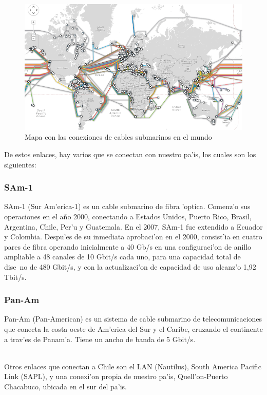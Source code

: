 \documentclass{article}
\begin{document}
\begin{figure}[H]
  \centering
    \includegraphics[width=1.0\textwidth]{mapamundo_enlaces}
  \caption{Mapa con las conexiones de cables submarinos en el mundo}
  \label{mapa}
\end{figure}

De estos enlaces, hay varios que se conectan con nuestro pa'is, los cuales son los siguientes:

\subsubsection{SAm-1}
SAm-1 (Sur Am'erica-1) es un cable submarino de fibra 'optica. Comenz'o sus operaciones en el a\~no 2000, conectando a Estados Unidos, Puerto Rico, Brasil, Argentina, Chile, Per'u y Guatemala. En el 2007, SAm-1 fue extendido a Ecuador y Colombia. Despu'es de su inmediata aprobaci'on en el 2000, consist'ia en cuatro pares de fibra operando inicialmente a 40 Gb/s en una configuraci'on de anillo ampliable a 48 canales de 10 Gbit/s cada uno, para una capacidad total de dise~no de 480 Gbit/s, y con la actualizaci'on de capacidad de uso alcanz'o 1,92 Tbit/s.

\subsubsection{Pan-Am}
Pan-Am (Pan-American) es un sistema de cable submarino de telecomunicaciones que conecta la costa oeste de Am'erica del Sur y el Caribe, cruzando el continente a trav'es de Panam'a. Tiene un ancho de banda de 5 Gbit/s.\\ \

Otros enlaces que conectan a Chile son el LAN (Nautilus), South America Pacific Link (SAPL), y una conexi'on propia de nuestro pa'is, Quell'on-Puerto Chacabuco, ubicada en el sur del pa'is.
\end{document}
